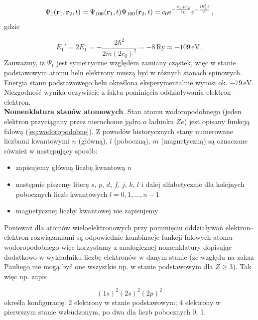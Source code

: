 \documentclass{myclass}
\begin{document}
\begin{equation*}
\Psi_1(\mathbf{r}_1,\mathbf{r}_2,t)=\Psi_{100}(\mathbf{r}_1,t)\Psi_{100}(\mathbf{r}_2,t)=c_0\mathrm{e}^{-\frac{r_1+r_2}{r_0}}\mathrm{e}^{-\frac{\mathrm{i} E_1't}{\hbar}}\,,
\end{equation*}
gdzie 

\begin{equation*}
E_1'=2E_1=-\frac{2\hbar^2}{2m(2r_0)^2}=-8\,\text{Ry}\approx  -109\,\text{eV}\,.
\end{equation*}
Zauważmy, iż \(\Psi_1\) jest symetryczne względem zamiany cząstek, więc w stanie podstawowym atomu
helu elektrony muszą być w różnych stanach spinowych. Energia stanu podstawowego helu określona
eksperymentalnie wynosi ok. \(-79\,\text{eV}\). Niezgodność wynika oczywiście z faktu pominięcia
oddziaływania elektron--elektron.\\

\textbf{Nomenklatura stanów atomowych}. Stan atomu wodoropodobnego (jeden elektron przyciągany przez
nieruchome jądro o ładunku \(Ze\)) jest opisany funkcją falową (\ref{eq:wodoropodobne}). Z powodów
historycznych stany numerowane liczbami kwantowymi \(n\) (główną), \(l\) (poboczną), \(m\)
(magnetyczną) są oznaczane również w następujący sposób:

\begin{itemize}

\item zapisujemy główną liczbę kwantową \(n\)

\item następnie piszemy literę \(s\), \(p\), \(d\), \(f\), \(j\), \(k\), \(l\) i dalej alfabetycznie
dla kolejnych pobocznych liczb kwantowych \(l=0,1,...,n-1\)

\item magnetycznej liczby kwantowej nie zapisujemy

\end{itemize}
Ponieważ dla atomów wieloelektronowych przy pominięciu oddziaływań elektron--elektron rozwiązaniami
są odpowiednie kombinacje funkcji falowych atomu wodoropodobnego więc korzystamy z analogicznej
nomenklatury dopisując dodatkowo w wykładniku liczbę elektronów w danym stanie (ze względu na zakaz
Pauliego nie mogą być one wszystkie np. w stanie podstawowym dla \(Z\geq 3\)). Tak więc np. zapis

\begin{equation*}
(1s)^2(2s)^2(2p)^2
\end{equation*}
określa konfigurację: 2 elektrony w stanie podstawowym; 4 elektrony w pierwszym stanie wzbudzonym,
po dwa dla liczb pobocznych 0, 1.
\end{document}
